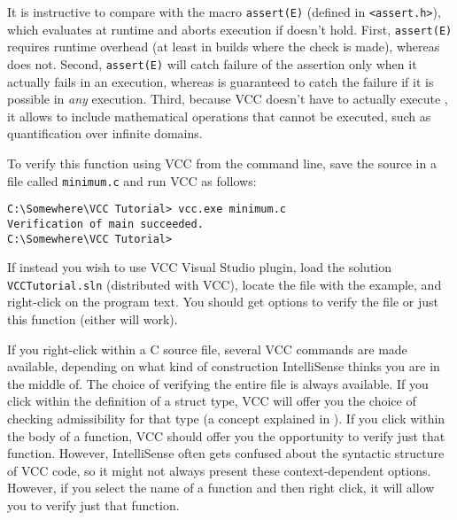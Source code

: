 \begin{note}
It is instructive to compare  with the macro
\lstinline|assert(E)| (defined in \lstinline|<assert.h>|), which
evaluates   at runtime and aborts execution if 
doesn't hold. First, \lstinline|assert(E)| requires runtime overhead (at least
in builds where the check is made), whereas  does
not. Second, \lstinline|assert(E)| will catch failure of the 
assertion only when it actually fails in an execution, whereas 
 is guaranteed to catch the failure if it is
possible in \emph{any} execution. Third, because VCC doesn't have to
actually execute , it allows  to include
mathematical operations that cannot be executed, such as
quantification over infinite domains.
\end{note}

To verify this function using VCC from the command line, save the source in a file called \lstinline|minimum.c|
and run VCC as follows:

\begin{lstlisting}
C:\Somewhere\VCC Tutorial> vcc.exe minimum.c
Verification of main succeeded.
C:\Somewhere\VCC Tutorial>
\end{lstlisting}

If instead you wish to use VCC Visual Studio plugin, load the solution \lstinline|VCCTutorial.sln|
(distributed with VCC), 
locate the file with the example, and right-click on the program text.
You should get options to verify the file or just this function (either will work).

\begin{note}
If you right-click within a C source file,
several VCC commands are made available, depending on what kind of
construction IntelliSense thinks you are in the middle of. The choice
of verifying the entire file is always available. If you click within
the definition of a struct type, VCC will offer you the choice of
checking admissibility for that type (a concept explained in ).
If you click within the body of a function, VCC should offer
you the opportunity to verify just that function. However,
IntelliSense often gets confused about the syntactic structure of
VCC code, so it might not always present these context-dependent
options. However, if you select the name of a function and then right
click, it will allow you to verify just that function.
\end{note}

